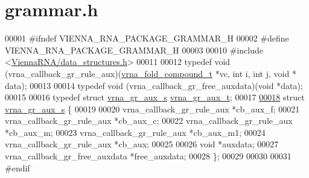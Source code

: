 \hypertarget{grammar_8h_source}{}\section{grammar.\+h}
\label{grammar_8h_source}

\begin{DoxyCode}
00001 \textcolor{preprocessor}{#ifndef VIENNA\_RNA\_PACKAGE\_GRAMMAR\_H}
00002 \textcolor{preprocessor}{#define VIENNA\_RNA\_PACKAGE\_GRAMMAR\_H}
00003 
00010 \textcolor{preprocessor}{#include <\hyperlink{data__structures_8h}{ViennaRNA/data\_structures.h}>}
00011 
00012 \textcolor{keyword}{typedef} void (vrna\_callback\_gr\_rule\_aux)(\hyperlink{group__fold__compound_structvrna__fc__s}{vrna\_fold\_compound\_t} *vc, \textcolor{keywordtype}{int} i, \textcolor{keywordtype}{int} j, \textcolor{keywordtype}{void} *
      data);
00013 
00014 \textcolor{keyword}{typedef} void (vrna\_callback\_gr\_free\_auxdata)(\textcolor{keywordtype}{void} *data);
00015 
00016 \textcolor{keyword}{typedef} \textcolor{keyword}{struct }\hyperlink{structvrna__gr__aux__s}{vrna\_gr\_aux\_s}  \hyperlink{structvrna__gr__aux__s}{vrna\_gr\_aux\_t};
00017 
\hypertarget{grammar_8h_source.tex_l00018}{}\hyperlink{structvrna__gr__aux__s}{00018} \textcolor{keyword}{struct }\hyperlink{structvrna__gr__aux__s}{vrna\_gr\_aux\_s} \{
00019 
00020   vrna\_callback\_gr\_rule\_aux     *cb\_aux\_f;
00021   vrna\_callback\_gr\_rule\_aux     *cb\_aux\_c;
00022   vrna\_callback\_gr\_rule\_aux     *cb\_aux\_m;
00023   vrna\_callback\_gr\_rule\_aux     *cb\_aux\_m1;
00024   vrna\_callback\_gr\_rule\_aux     *cb\_aux;
00025 
00026   \textcolor{keywordtype}{void}                          *auxdata;
00027   vrna\_callback\_gr\_free\_auxdata *free\_auxdata;
00028 \};
00029 
00030 
00031 \textcolor{preprocessor}{#endif}
\end{DoxyCode}
